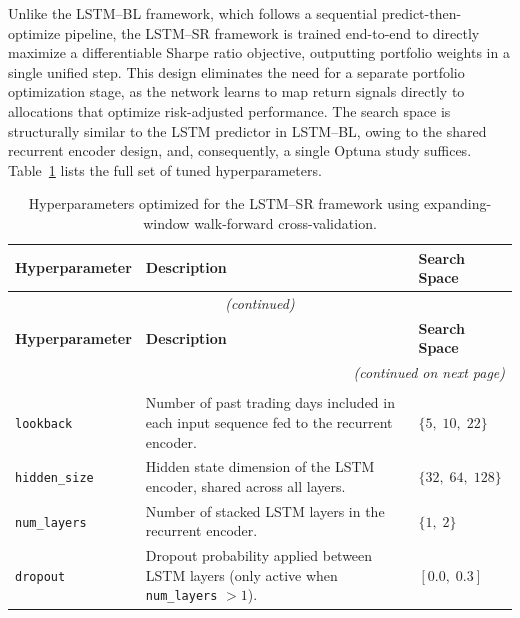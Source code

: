 Unlike the LSTM--BL framework, which follows a sequential predict-then-optimize pipeline, the LSTM--SR framework is trained end-to-end to directly maximize a differentiable Sharpe ratio objective, outputting portfolio weights in a single unified step. This design eliminates the need for a separate portfolio optimization stage, as the network learns to map return signals directly to allocations that optimize risk-adjusted performance. The search space is structurally similar to the LSTM predictor in LSTM--BL, owing to the shared recurrent encoder design, and, consequently, a single Optuna study suffices. Table~\ref{tab:hp_lstm_sr} lists the full set of tuned hyperparameters.

\begin{longtable}{@{}p{3.7cm} p{7.5cm} p{3.3cm}@{}}
\caption{Hyperparameters optimized for the LSTM--SR framework using expanding-window walk-forward cross-validation.}
\label{tab:hp_lstm_sr} \\
\toprule
\textbf{Hyperparameter} & \textbf{Description} & \textbf{Search Space} \\
\midrule
\endfirsthead

\multicolumn{3}{c}{\footnotesize\textit{(continued)}} \\
\toprule
\textbf{Hyperparameter} & \textbf{Description} & \textbf{Search Space} \\
\midrule
\endhead

\bottomrule
\multicolumn{3}{r}{\footnotesize\textit{(continued on next page)}} \\
\endfoot

\bottomrule
\endlastfoot
 
\multicolumn{3}{@{}l}{\small\textit{--- Architecture Hyperparameters ---}} \\[2pt]
 
\texttt{lookback} & Number of past trading days included in each input sequence fed to the recurrent encoder. & $\{5,\;10,\;22\}$ \\[4pt]
 
\texttt{hidden\_size} & Hidden state dimension of the LSTM encoder, shared across all layers. & $\{32,\;64,\;128\}$ \\[4pt]
 
\texttt{num\_layers} & Number of stacked LSTM layers in the recurrent encoder. & $\{1,\;2\}$ \\[4pt]
 
\texttt{dropout} & Dropout probability applied between LSTM layers (only active when \texttt{num\_layers} $> 1$). & $[0.0,\;0.3]$ \\[4pt]
 

\end{longtable}
